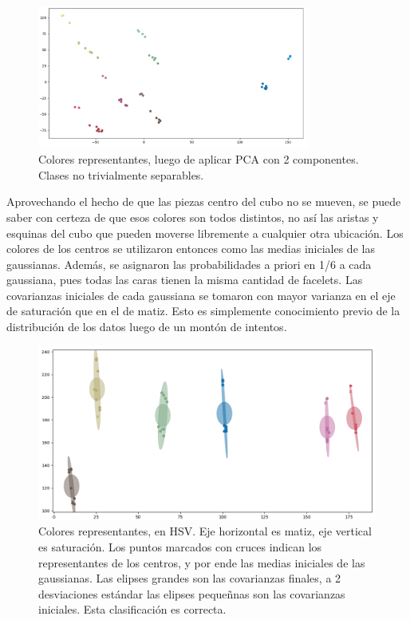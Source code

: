 \begin{figure}[h!]
	\centering
	\includegraphics[width=0.8\textwidth]{figures/rgb_pca}
	\caption{Colores representantes, luego de aplicar PCA con 2 componentes. Clases no trivialmente separables.}
	\label{rgb3d}
\end{figure}

Aprovechando el hecho de que las piezas centro del cubo no se mueven, se puede saber con certeza de que esos colores son todos distintos, no así las aristas y esquinas del cubo que pueden moverse libremente a cualquier otra ubicación. Los colores de los centros se utilizaron entonces como las medias iniciales de las gaussianas. Además, se asignaron las probabilidades a priori en 1/6 a cada gaussiana, pues todas las caras tienen la misma cantidad de facelets. Las covarianzas iniciales de cada gaussiana se tomaron con mayor varianza en el eje de saturación que en el de matiz. Esto es simplemente conocimiento previo de la distribución de los datos luego de un montón de intentos.

\begin{figure}[h!]
	\centering
	\includegraphics[width=\textwidth]{figures/gmm}
	\caption{Colores representantes, en HSV. Eje horizontal es matiz, eje vertical es saturación. Los puntos marcados con cruces indican los representantes de los centros, y por ende las medias iniciales de las gaussianas. Las elipses grandes son las covarianzas finales, a 2 desviaciones estándar las elipses pequeñnas son las covarianzas iniciales. Esta clasificación es correcta.}
	\label{gmmgood}
\end{figure}

